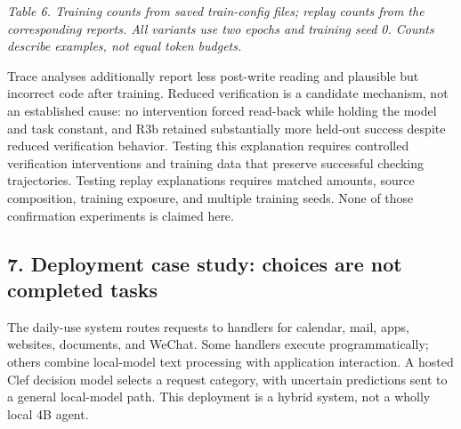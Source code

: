 \documentclass[
  10pt,
]{article}
\begin{document}
\emph{Table 6. Training counts from saved train-config files; replay
counts from the corresponding reports. All variants use two epochs and
training seed 0. Counts describe examples, not equal token budgets.}

Trace analyses additionally report less post-write reading and plausible
but incorrect code after training. Reduced verification is a candidate
mechanism, not an established cause: no intervention forced read-back
while holding the model and task constant, and R3b retained
substantially more held-out success despite reduced verification
behavior. Testing this explanation requires controlled verification
interventions and training data that preserve successful checking
trajectories. Testing replay explanations requires matched amounts,
source composition, training exposure, and multiple training seeds. None
of those confirmation experiments is claimed here.

\subsection{7. Deployment case study: choices are not completed
tasks}\label{deployment-case-study-choices-are-not-completed-tasks}

The daily-use system routes requests to handlers for calendar, mail,
apps, websites, documents, and WeChat. Some handlers execute
programmatically; others combine local-model text processing with
application interaction. A hosted Clef decision model selects a request
category, with uncertain predictions sent to a general local-model path.
This deployment is a hybrid system, not a wholly local 4B agent.
\end{document}
